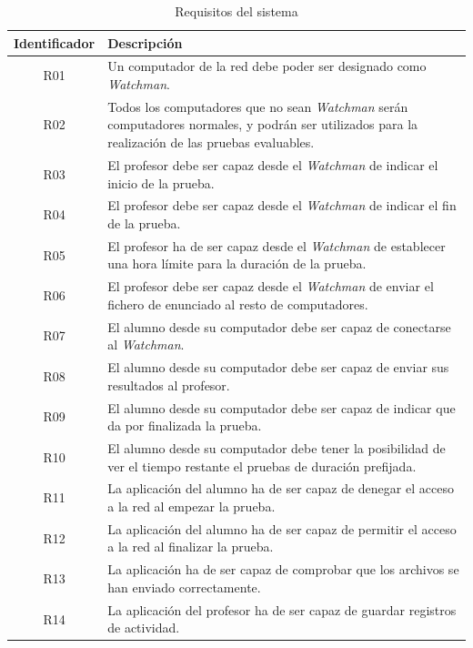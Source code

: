 \begin{table}
\begin{tabular}{|c|l|}
	\hline
	\textbf{Identificador} & \textbf{Descripción}
	\\ \hline

	R01 & Un computador de la red debe poder ser designado como \emph{Watchman}.
	\\ \hline

	R02 & Todos los computadores que no sean \emph{Watchman} serán computadores
	normales, y podrán ser utilizados para la realización de las pruebas evaluables.
	\\ \hline

	R03 & El profesor debe ser capaz desde el \emph{Watchman} de indicar el inicio de la prueba.
	\\ \hline

	R04 & El profesor debe ser capaz desde el \emph{Watchman} de indicar el fin de la prueba.
	\\ \hline

	R05 & El profesor ha de ser capaz desde el \emph{Watchman} de establecer una hora límite para la duración de la prueba.
	\\ \hline

	R06 & El profesor debe ser capaz desde el \emph{Watchman} de enviar el fichero de enunciado al resto de computadores.
	\\ \hline

	R07 & El alumno desde su computador debe ser capaz de conectarse al \emph{Watchman}.
	\\ \hline

	R08 & El alumno desde su computador debe ser capaz de enviar sus resultados al profesor.
	\\ \hline

	R09 & El alumno desde su computador debe ser capaz de indicar que da por finalizada la prueba.
	\\ \hline

	R10 & El alumno desde su computador debe tener la posibilidad de ver el tiempo restante el pruebas de duración prefijada.
	\\ \hline

	R11 & La aplicación del alumno ha de ser capaz de denegar el acceso a la red al empezar la prueba.
	\\ \hline

	R12 & La aplicación del alumno ha de ser capaz de permitir el acceso a la red al finalizar la prueba.
	\\ \hline

	R13 & La aplicación ha de ser capaz de comprobar que los archivos se han enviado correctamente.
	\\ \hline

	R14 & La aplicación del profesor ha de ser capaz de guardar registros de actividad.
	\\ \hline

\end{tabular}
\label{tabla:requisitos}
\caption{Requisitos del sistema}
\end{table}


